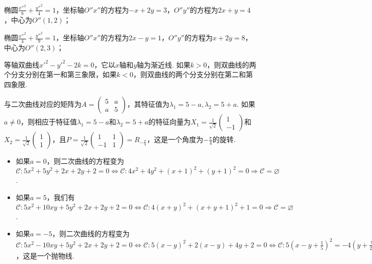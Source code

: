 \begin{solution}
\begin{inparaenum}[(1)]
    \item 椭圆$\frac{x''^2}8+\frac{y''^2}4=1$，坐标轴$O''x''$的方程为$-x+2y=3$，$O''y''$的方程为$2x+y=4$，中心为$O''(1,2)$；

    \item 椭圆$\frac{x''^2}4+\frac{y''^2}9=1$，坐标轴$O''x''$的方程为$2x-y=1$，$O''y''$的方程为$x+2y=8$，中心为$O''(2,3)$；

    \item 等轴双曲线$x'^2-y'^2-2k=0$，它以$x$轴和$y$轴为渐近线. 如果$k>0$，则双曲线的两个分支分别在第一和第三象限，如果$k<0$，则双曲线的两个分支分别在第二和第四象限.
  \end{inparaenum}
\end{solution}

\begin{solution}
  \begin{inparaenum}[(1)]
    \item 与二次曲线对应的矩阵为$A=\begin{pmatrix}
      5 & a \\
      a & 5
    \end{pmatrix}$，其特征值为$\lambda_1=5-a,\lambda_2=5+a$. 如果$a\ne0$，则相应于特征值$\lambda_1=5-a$和$\lambda_2=5+a$的特征向量为$X_1=\frac1{\sqrt2}\begin{pmatrix}
      1 \\
      -1
    \end{pmatrix}$和$X_2=\frac1{\sqrt2}\begin{pmatrix}
      1 \\
      1
    \end{pmatrix}$，且$P=\frac1{\sqrt2}\begin{pmatrix}
      1 & 1\\
      -1 & 1
    \end{pmatrix}=R_{-\frac\pi4}$，这是一个角度为$-\frac\pi4$的旋转.
  \end{inparaenum}
  \begin{itemize}
    \item 如果$a=0$，则二次曲线的方程变为$\mathscr C:5x^2+5y^2+2x+2y+2=0\Leftrightarrow \mathscr C:4x^2+4y^2+(x+1)^2+(y+1)^2=0\Rightarrow \mathscr C=\varnothing$.
    \item 如果$a=5$，我们有$\mathscr C:5x^2+10xy+5y^2+2x+2y+2=0\Leftrightarrow \mathscr C:4(x+y)^2+(x+y+1)^2+1=0\Rightarrow\mathscr C=\varnothing$.
    \item 如果$a=-5$，则二次曲线的方程变为$\mathscr C:5x^2-10xy+5y^2+2x+2y+2=0\Leftrightarrow
        \mathscr C:5(x-y)^2+2(x-y)+4y+2=0\Leftrightarrow
        \mathscr C:5\left(x-y+\frac15\right)^2=-4\left(y+
        \frac9{20}\right)$，这是一个抛物线.
  \end{itemize}


\end{solution}
